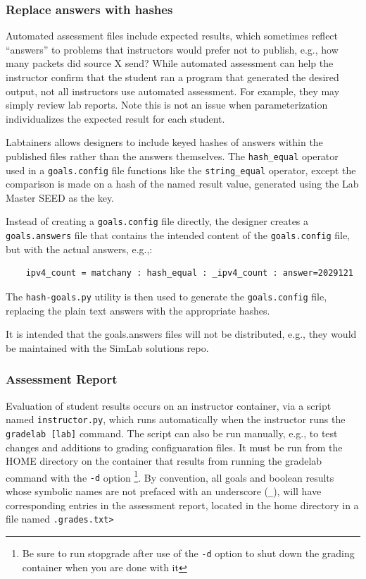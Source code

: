 \documentclass[12pt]{article}
\begin{document}
\subsubsection{Replace answers with hashes}
\label{hash-goals}
Automated assessment files include expected results, which sometimes reflect ``answers'' to problems
that instructors would prefer not to publish, e.g., how many packets did source X send?
While automated assessment can help the instructor confirm that the student ran a program that generated the
desired output, not all instructors use automated assessment.  For example, they may simply review lab reports.
Note this is not an issue when parameterization individualizes the expected result for each student.

Labtainers allows designers to include keyed hashes of answers within the published files rather
than the answers themselves.  The {\tt hash\_equal} operator used in a {\tt goals.config} file functions like
the {\tt string\_equal} operator, except the comparison is made on a hash of the named result value, generated
using the Lab Master SEED as the key.  

Instead of creating a {\tt goals.config} file directly, the designer creates a {\tt goals.answers} file that
contains the intended content of the {\tt goals.config} file, but with the actual answers, e.g.,:
\begin{verbatim}
    ipv4_count = matchany : hash_equal : _ipv4_count : answer=2029121
\end{verbatim}
\noindent The {\tt hash-goals.py} utility is then used to generate the {\tt goals.config} file, replacing
the plain text answers with the appropriate hashes.  

It is intended that the goals.answers files will not be distributed, e.g., they would be maintained with the
SimLab solutions repo.

\subsubsection{Assessment Report}
Evaluation of student results occurs on an instructor container, via a script named {\tt instructor.py}, which runs
automatically when the instructor runs the {\tt gradelab [lab]} command.  The script can also be run manually, e.g., to
test changes and additions to grading configuaration files.  It must be run from the HOME directory
on the container that results from running the gradelab command with the {\tt -d} option \footnote{Be sure to run
stopgrade after use of the {\tt -d} option to shut down the grading container when you are done with it}.
By convention, all goals and boolean results whose symbolic names are not prefaced with an
underscore ({\tt\_}), will have corresponding entries in the assessment report, located in 
the home directory in a file named {\tt <lab name>.grades.txt>}
\end{document}
